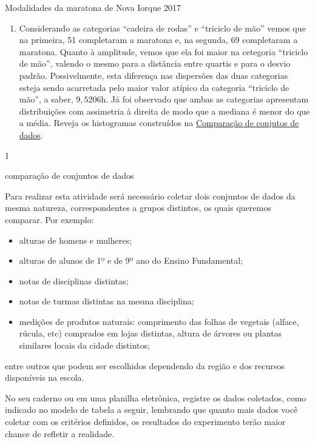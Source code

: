 {{{\begin{answer}{Modalidades da maratona de Nova Iorque 2017}
{\begin{enumerate}
\item Considerando as categorias “cadeira de rodas”{} e “triciclo de mão”{} vemos que na primeira, 51 completaram a maratona e, na segunda, 69 completaram a maratona. Quanto à amplitude, vemos que ela foi maior na cetegoria “triciclo de mão”, valendo o mesmo para a distância entre quartis e para o desvio padrão. Possivelmente, esta diferença nas dispersões das duas categorias esteja sendo acarretada pelo maior valor atípico da categoria “triciclo de mão”, a saber, $9{,}5206$h. Já foi observado que ambas as categorias apresentam distribuições com assimetria à direita de modo que a mediana é menor do que a média. Reveja os histogramas construídos na \hyperref[\detokenize{PE104-5:ativ-compara-categorias}]{Comparação de conjutos de dados}.
\end{enumerate}
}{1}
\end{answer}

\label{\detokenize{PE104-5:sec-praticando2}}\label{\detokenize{PE104-5::doc}}\label{\detokenize{PE104-5:praticando}}\label{\detokenize{PE104-5:ativ-compara-categorias}}
\begin{task}{ comparação de conjuntos de dados}

Para realizar esta atividade será necessário coletar dois conjuntos de dados da mesma natureza, correspondentes a grupos distintos, os quais queremos comparar. Por exemplo:
\begin{itemize}
\item {} 
alturas de homens e mulheres;

\item {} 
alturas de alunos de 1º e de 9º ano do Ensino Fundamental;

\item {} 
notas de disciplinas distintas;

\item {} 
notas de turmas distintas na mesma disciplina;

\item {} 
medições de produtos naturais: comprimento das folhas de vegetais (alface, rúcula, etc) comprados em lojas distintas, altura de árvores ou plantas similares locais da cidade distintos;

\end{itemize}

entre outros que podem ser escolhidos dependendo da região e dos recursos disponíveis na escola.

No seu caderno ou em uma planilha eletrônica, registre os dados coletados, como indicado no modelo de tabela a seguir, lembrando que quanto mais dados você coletar com os critérios definidos, os resultados do experimento terão maior chance de refletir a realidade.


\end{task}}}}
